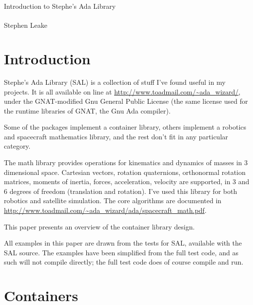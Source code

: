 \documentclass{article}
\begin{document}
\begin{center}
{\Large Introduction to Stephe's Ada Library}\\ 
\hfill\\
{\large Stephen Leake \\ }
\end{center}

\begin{abstract}
Stephe's Ada Library (SAL) containers are designed to support the
widest possible range of item and container types
(limited/non-limited, indefinite/definite, etc). SAL containers are
defined by the operations required to implement algorithms. Issues
that arise in the implementation of this design are discussed.
\end{abstract}

\section{Introduction}
Stephe's Ada Library (SAL) is a collection of stuff I've found useful
in my projects. It is all available on line at
\href{http://www.toadmail.com/~ada_wizard/}{\url{http://www.toadmail.com/~ada_wizard/}},
under the GNAT-modified Gnu General Public License (the same license
used for the runtime libraries of GNAT, the Gnu Ada compiler).

Some of the packages implement a container library, others implement a
robotics and spacecraft mathematics library, and the rest don't fit in
any particular category.

The math library provides operations for kinematics and dynamics of
masses in 3 dimensional space. Cartesian vectors, rotation
quaternions, orthonormal rotation matrices, moments of inertia,
forces, acceleration, velocity are supported, in 3 and 6 degrees of
freedom (translation and rotation). I've used this library for both
robotics and satellite simulation. The core algorithms are documented
in
\href{http://www.toadmail.com/~ada_wizard/ada/spacecraft_math.pdf}{\url{http://www.toadmail.com/~ada_wizard/ada/spacecraft_math.pdf}}.

This paper presents an overview of the container library design.

All examples in this paper are drawn from the tests for SAL, available
with the SAL source. The examples have been simplified from the full
test code, and as such will not compile directly; the full test code
does of course compile and run.

\section{Containers}
\end{document}
